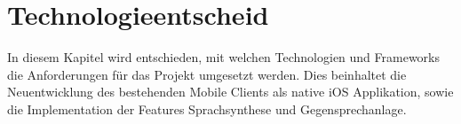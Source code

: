 \section{Technologieentscheid}

In diesem Kapitel wird entschieden, mit welchen Technologien und Frameworks die Anforderungen für das Projekt umgesetzt werden.
Dies beinhaltet die Neuentwicklung des bestehenden Mobile Clients als native iOS Applikation, sowie die Implementation der Features Sprachsynthese und Gegensprechanlage.




